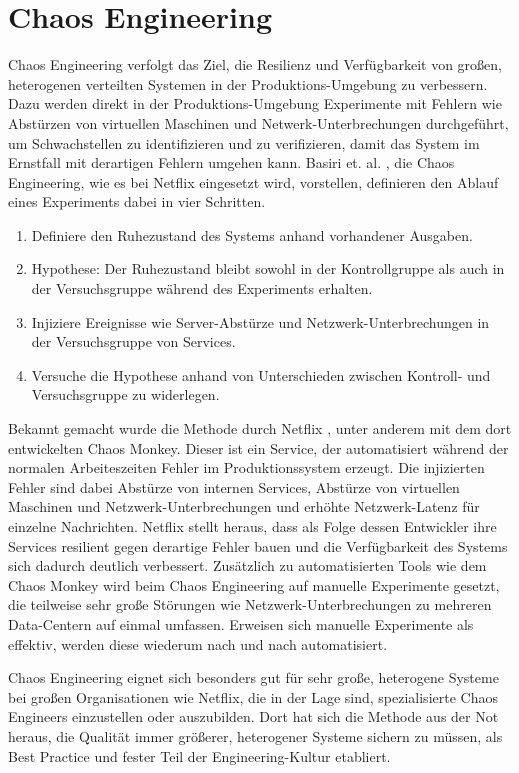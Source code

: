 \documentclass[12pt,a4paper]{report}
\begin{document}
\section{Chaos Engineering}
Chaos Engineering verfolgt das Ziel, die Resilienz und Verfügbarkeit von großen, heterogenen verteilten Systemen in der
Produktions-Umgebung zu verbessern. Dazu werden direkt in der Produktions-Umgebung Experimente mit Fehlern wie Abstürzen von
virtuellen Maschinen und Netwerk-Unter\-brech\-ungen durchgeführt, um Schwachstellen zu identifizieren und zu verifizieren, damit das
System im Ernstfall mit derartigen Fehlern umgehen kann. Basiri et. al. \cite{chaos_engineering}, die Chaos Engineering, wie es
bei Netflix eingesetzt wird, vorstellen, definieren den Ablauf eines Experiments dabei in vier Schritten.
\begin{enumerate}
	\item Definiere den Ruhezustand des Systems anhand vorhandener Ausgaben.
	\item Hypothese: Der Ruhezustand bleibt sowohl in der Kontrollgruppe als auch in der Versuchsgruppe während des Experiments erhalten.
	\item Injiziere Ereignisse wie Server-Abstürze und Netzwerk-Unterbrechungen in der Versuchsgruppe von Services.
	\item Versuche die Hypothese anhand von Unterschieden zwischen Kontroll- und Versuchsgruppe zu widerlegen.
\end{enumerate}
Bekannt gemacht wurde die Methode durch Netflix \cite{abstracting_the_geniuses}, unter anderem mit dem dort entwickelten Chaos
Monkey. Dieser ist ein Service, der automatisiert während der normalen Arbeiteszeiten Fehler im Produktionssystem erzeugt. Die
injizierten Fehler sind dabei Abstürze von internen Services, Abstürze von virtuellen Maschinen und Netzwerk-Unterbrechungen und
er\-höh\-te Netzwerk-Latenz für einzelne Nachrichten. Netflix stellt heraus, dass als Folge dessen Entwickler ihre Services resilient gegen
derartige Fehler bauen und die Verfügbarkeit des Systems sich dadurch deutlich verbessert. Zusätzlich zu automatisierten Tools
wie dem Chaos Monkey wird beim Chaos Engineering auf manuelle Experimente gesetzt, die teilweise sehr große Störungen wie
Netzwerk-Unterbrechungen zu mehreren Data-Centern auf einmal umfassen. Erweisen sich manuelle Experimente
als effektiv, werden diese wiederum nach und nach automatisiert. \cite{chaos_engineering}

Chaos Engineering eignet sich besonders gut für sehr große, heterogene Systeme bei großen Organisationen wie Netflix, die in der
Lage sind, spezialisierte Chaos Engineers einzustellen oder auszubilden. Dort hat sich die Methode aus der Not heraus, die
Qualität immer größerer, heterogener Systeme sichern zu müssen, als Best Practice und fester Teil der Engineering-Kultur
etabliert. \cite{abstracting_the_geniuses}
\end{document}
